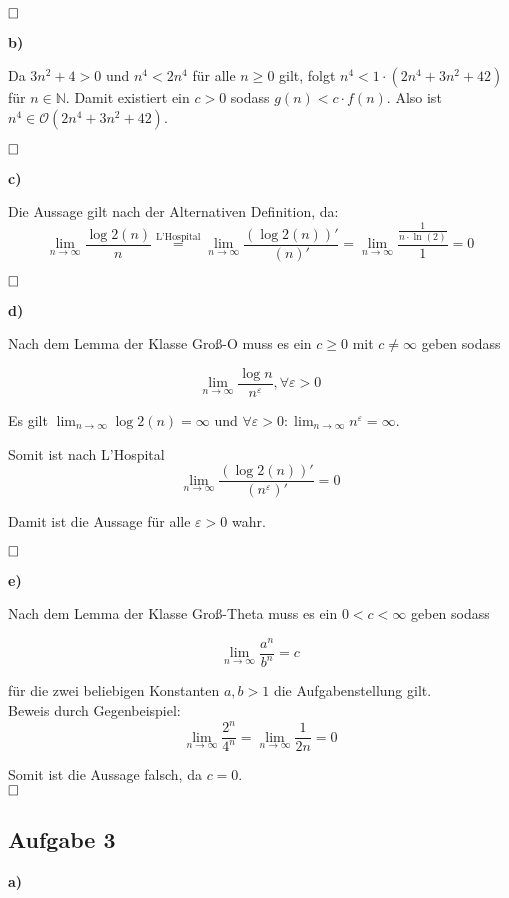 \documentclass[a4paper,graphics,11pt]{article}
\newcommand{\aufgabe}[1]{\subsection*{Aufgabe #1}}
\begin{document}
	
	$\hfill\square$




\textbf{b)}

Da $3n^2+4 > 0$ und $ n^4 < 2n^4 $ für alle $n \geq 0$ gilt, folgt
$n^4 < 1 \cdot(2n^4+3n^2+42)$ für $n \in \mathbb{N}$. Damit existiert ein $c > 0$ sodass $g(n) < c \cdot f(n)$. Also ist $n^4 \in \mathcal{O}(2n^4+3n^2+42)$.

$\hfill\square$



\textbf{c)}

Die Aussage gilt nach der Alternativen Definition, da:
$$
\lim_{n\rightarrow\infty} \frac{\log2(n)}{n} \overset{\text{L'Hospital}}{=} \lim_{n\rightarrow\infty} \frac{(\log2(n))'}{(n)'} = \lim_{n\rightarrow\infty} \frac{\frac{1}{n\cdot \ln(2)}}{1} = 0
$$

$\hfill\square$

\newpage

\textbf{d)}

Nach dem Lemma der Klasse Groß-O muss es ein $c \geq 0$ mit $c \neq \infty$ geben sodass

$$
\lim_{n\rightarrow\infty} \frac{\log n}{n^\varepsilon}, \forall \varepsilon > 0
$$

Es gilt $\lim_{n\rightarrow\infty} \log2 (n) = \infty$ und $\forall\varepsilon > 0 :
\lim_{n\rightarrow\infty}  n^\varepsilon = \infty$.

Somit ist nach L'Hospital 
$$
\lim_{n\rightarrow\infty} \frac{(\log2(n))'}{(n^\varepsilon)'} = 0
$$

Damit ist die Aussage für alle $\varepsilon>0$ wahr.

$\hfill\square$

\textbf{e)}


Nach dem Lemma der Klasse Groß-Theta muss es ein $ 0 < c< \infty$ geben sodass

$$
\lim_{n\rightarrow\infty} \frac{a^n}{b^n} = c
$$

für die zwei beliebigen Konstanten $a,b > 1$ die Aufgabenstellung gilt.\\
Beweis durch Gegenbeispiel:\\
$$
\lim_{n\rightarrow\infty} \frac{2^n}{4^n} = \lim_{n\rightarrow\infty} \frac{1}{2n} = 0
$$

Somit ist die Aussage falsch, da $c=0$.\\

$\hfill\square$

\newpage

\aufgabe{3}
\textbf{a)}
\end{document}
